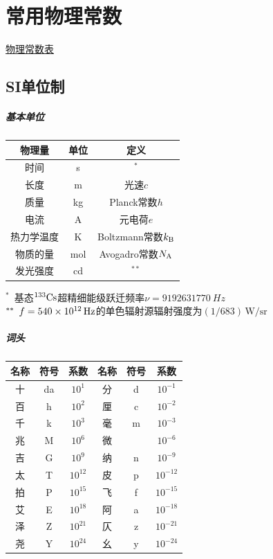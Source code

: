 \chapter{常用物理常数}
\href{https://en.wikipedia.org/wiki/List_of_physical_constants}{物理常数表}
\section{SI单位制}
\paragraph{基本单位}
\begin{notecaptionblock}
	\begin{tabular}{ccc}
		\toprule
		物理量&单位&定义\\
		\midrule
		时间&\unit{\second}&$^\ast$\\
		长度&\unit{\metre}&光速$c$\\%
		质量&\unit{\kilogram}&Planck常数$h$\\%
		电流&\unit{\ampere}&元电荷$e$\\%
		热力学温度&\unit{\kelvin}&Boltzmann常数$k_{\mathrm{B}}$\\%
		物质的量&\unit{\mole}&Avogadro常数$N_{\mathrm{A}}$\\
		发光强度&\unit{\candela}&$^{\ast\ast}$\\
		\bottomrule
	\end{tabular}
\end{notecaptionblock}
$^\ast\enspace$基态$\nuclide{133}{Cs}$超精细能级跃迁频率$\nu = \qty{9192631770}{Hz}$\\
\noindent
$^{\ast\ast}\enspace f = \qty{540E12}{Hz}$的单色辐射源辐射强度为$(1/683)\,\unit{\watt\per\steradian}$
\paragraph{词头}
\begin{notecaptionblock}
	\begin{tabular}{ccc|ccc}
		\toprule
		名称&符号&系数&名称&符号&系数\\
		\midrule
		十&da&$10^1$&分&d&$10^{-1}$\\
		百&h&$10^2$&厘&c&$10^{-2}$\\
		千&k&$10^3$&毫&m&$10^{-3}$\\
		兆&M&$10^6$&微&\textmu&$10^{-6}$\\
		吉&G&$10^9$&纳&n&$10^{-9}$\\
		太&T&$10^{12}$&皮&p&$10^{-12}$\\
		拍&P&$10^{15}$&飞&f&$10^{-15}$\\
		艾&E&$10^{18}$&阿&a&$10^{-18}$\\
		泽&Z&$10^{21}$&仄&z&$10^{-21}$\\
		尧&Y&$10^{24}$&幺&y&$10^{-24}$\\
		\bottomrule
	\end{tabular}
\end{notecaptionblock}
